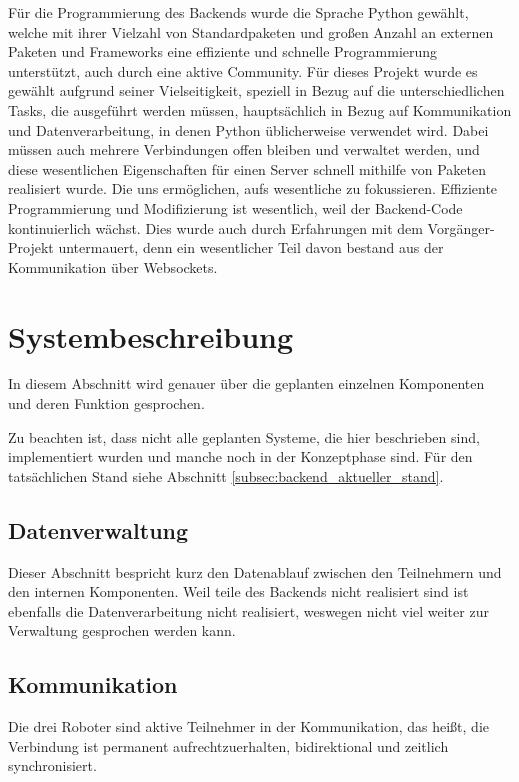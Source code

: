 Für die Programmierung des Backends wurde die Sprache Python gewählt, 
welche mit ihrer Vielzahl von Standardpaketen 
und großen Anzahl an externen Paketen 
und Frameworks eine effiziente und schnelle Programmierung unterstützt, 
auch durch eine aktive Community.
% 
Für dieses Projekt wurde es gewählt aufgrund seiner Vielseitigkeit, 
speziell in Bezug auf die unterschiedlichen Tasks, 
die ausgeführt werden müssen, 
hauptsächlich in Bezug auf Kommunikation und Datenverarbeitung, 
in denen Python üblicherweise verwendet wird.
% 
Dabei müssen auch mehrere Verbindungen offen bleiben und verwaltet werden, 
und diese wesentlichen Eigenschaften für einen Server 
schnell mithilfe von Paketen realisiert wurde. 
% 
Die uns ermöglichen, aufs wesentliche zu fokussieren.
% 
Effiziente Programmierung und Modifizierung ist wesentlich, 
weil der Backend-Code kontinuierlich wächst.
% 
Dies wurde auch durch Erfahrungen mit dem Vorgänger-Projekt untermauert, 
denn ein wesentlicher Teil davon bestand aus der Kommunikation über Websockets.
\section{Systembeschreibung}
In diesem Abschnitt wird genauer 
über die geplanten einzelnen Komponenten 
und deren Funktion gesprochen.

Zu beachten ist, dass nicht alle geplanten Systeme, die hier beschrieben sind, 
implementiert wurden und manche noch in der Konzeptphase sind.
Für den tatsächlichen Stand siehe Abschnitt \ref{subsec:backend_aktueller_stand}.

\subsection{Datenverwaltung}
\label{subsec:backend_data}

Dieser Abschnitt bespricht kurz den Datenablauf 
zwischen den Teilnehmern und den internen Komponenten.
% 
Weil teile des Backends nicht realisiert sind ist ebenfalls 
die Datenverarbeitung nicht realisiert,
weswegen nicht viel weiter zur Verwaltung gesprochen werden kann.

\subsection{Kommunikation}
\label{subsec:Kommunikation}
Die drei Roboter sind aktive Teilnehmer in der Kommunikation, 
das heißt, die Verbindung ist permanent aufrechtzuerhalten, 
bidirektional und zeitlich synchronisiert. 

